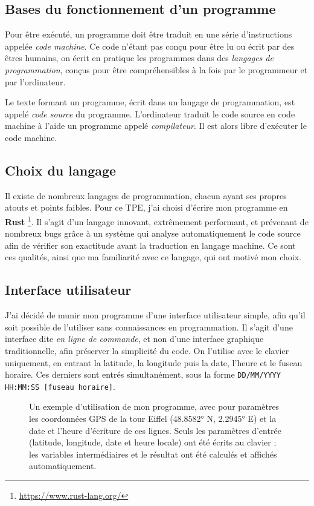 \documentclass[12pt]{article}
\begin{document}
\subsection{Bases du fonctionnement d'un programme}

Pour être exécuté, un programme doit être traduit en une série d'instructions appelée \emph{code machine}.
Ce code n'étant pas conçu pour être lu ou écrit par des êtres humains, on écrit en pratique les programmes dans des \emph{langages de programmation}, conçus pour être compréhensibles à la fois par le programmeur et par l'ordinateur.

Le texte formant un programme, écrit dans un langage de programmation, est appelé \emph{code source} du programme.
L'ordinateur traduit le code source en code machine à l'aide un programme appelé \emph{compilateur}.
Il est alors libre d'exécuter le code machine.


\subsection{Choix du langage}

Il existe de nombreux langages de programmation, chacun ayant ses propres atouts et points faibles.
Pour ce TPE, j'ai choisi d'écrire mon programme en \textbf{Rust} \footnote{\url{https://www.rust-lang.org/}}.
Il s'agit d'un langage innovant, extrêmement performant, et prévenant de nombreux bugs grâce à un système qui analyse automatiquement le code source afin de vérifier son exactitude avant la traduction en langage machine.
Ce sont ces qualités, ainsi que ma familiarité avec ce langage, qui ont motivé mon choix.


\subsection{Interface utilisateur}

J'ai décidé de munir mon programme d'une interface utilisateur simple, afin qu'il soit possible de l'utiliser sans connaissances en programmation.
Il s'agit d'une interface dite \emph{en ligne de commande}, et non d'une interface graphique traditionnelle, afin préserver la simplicité du code.
On l'utilise avec le clavier uniquement, en entrant la latitude, la longitude puis la date, l'heure et le fuseau horaire.
Ces derniers sont entrés simultanément, sous la forme \texttt{DD/MM/YYYY HH:MM:SS [fuseau horaire]}.

\begin{figure}[!htbp]
  \centering
  \caption{Un exemple d'utilisation de mon programme, avec pour paramètres les coordonnées GPS de la tour Eiffel (48.8582° N, 2.2945° E) et la date et l'heure d'écriture de ces lignes. Seuls les paramètres d'entrée (latitude, longitude, date et heure locale) ont été écrits au clavier ; les variables intermédiaires et le résultat ont été calculés et affichés automatiquement.}
  \label{fig:demo}
\end{figure}
\end{document}
